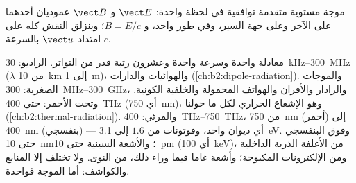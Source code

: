 \begin{omfigure}

{\small موجة مستوية متقدمة توافقية في لحظة واحدة: $\vect E$ و
$\vect B$ عموديان أحدهما على الآخر وعلى جهة السير، وفي
طور واحد، و $B = E/c$؛ وينزلق النقش كله على امتداد $\vect u$ بالسرعة $c$.}
\end{omfigure}

\begin{remark}[الطيف]\label{rem:b2:plane-waves-polarization:spectrum}
معادلة واحدة وسرعة واحدة وعشرون رتبة قدر من التواتر.
الراديو: \qty{30}{kHz}--\qty{300}{MHz} ($\lambda$ من \qty{10}{km} إلى \qty{1}{m})،
والهوائيات والدارات (\cref{ch:b2:dipole-radiation}). والموجات الصغرية:
\qty{300}{MHz}--\qty{300}{GHz}، والرادار والأفران والهواتف المحمولة والخلفية
الكونية. وتحت الأحمر: حتى \qty{400}{THz} (أي \qty{750}{nm})، وهو الإشعاع
الحراري لكل ما حولنا (\cref{ch:b2:thermal-radiation}).
والمرئي: \qty{400}{THz}--\qty{750}{THz}، من \qty{750}{nm} (أحمر) إلى \qty{400}{nm}
(بنفسجي) --- أي ديوان واحد، وفوتونات من $1.6$ إلى \qty{3.1}{eV}. وفوق البنفسجي حتى
\qty{10}{nm}؛ والأشعة السينية حتى \qty{10}{pm} (أي \qty{100}{keV})، من الأغلفة الذرية الداخلية
ومن الإلكترونات المكبوحة؛ وأشعة غاما فيما وراء ذلك، من النوى. ولا تختلف إلا المنابع
والكواشف: أما الموجة فواحدة.
\end{remark}

